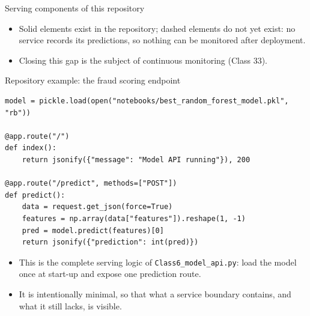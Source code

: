 \begin{frame}{Serving components of this repository}
\centering
{}
\vspace{0.6em}
\begin{itemize}\footnotesize
\item Solid elements exist in the repository; dashed elements do not yet exist: no service records its predictions, so nothing can be monitored after deployment.
\item Closing this gap is the subject of continuous monitoring (Class 33).
\end{itemize}
\coursefooter
\end{frame}

\begin{frame}[fragile]{Repository example: the fraud scoring endpoint}
\begin{lstlisting}[style=coursepython]
model = pickle.load(open("notebooks/best_random_forest_model.pkl", "rb"))

@app.route("/")
def index():
    return jsonify({"message": "Model API running"}), 200

@app.route("/predict", methods=["POST"])
def predict():
    data = request.get_json(force=True)
    features = np.array(data["features"]).reshape(1, -1)
    pred = model.predict(features)[0]
    return jsonify({"prediction": int(pred)})
\end{lstlisting}
\begin{itemize}
\item This is the complete serving logic of \texttt{Class6\_model\_api.py}: load the model once at start-up and expose one prediction route.
\item It is intentionally minimal, so that what a service boundary contains, and what it still lacks, is visible.
\end{itemize}
\coursefooter
\end{frame}

